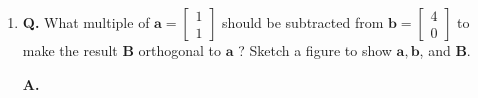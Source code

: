 \documentclass[main.tex]{subfiles}
\begin{document}
\begin{enumerate}
$$\begin{aligned}
\begin{array}{ll}
    9 & 0 \\
    0 & 9
    \end{array}\right] \\
    &=\left[\begin{array}{ll}
    1 & 0 \\
    0 & 1
    \end{array}\right]\\
    Q Q^{T} &=\frac{1}{3}\left[\begin{array}{cc}
    2 & -1 \\
    2 & 2 \\
    -1 & 2
    \end{array}\right] \cdot \frac{1}{3}\left[\begin{array}{ccc}
    2 & 2 & -1 \\
    -1 & 2 & 2
    \end{array}\right] \\
    &=\frac{1}{9}\left[\begin{array}{ccc}
    5 & 2 & -4 \\
    2 & 8 & 2 \\
    -4 & 2 & 5
    \end{array}\right]
    \end{aligned}
    $$
    
    \item [13.] \textbf{Q.} What multiple of $\bm{a}=\left[\begin{array}{l}1 \\ 1\end{array}\right]$ should be subtracted from $\boldsymbol{b}=\left[\begin{array}{l}4 \\ 0\end{array}\right]$ to make the result $\boldsymbol{B}$ orthogonal to $\boldsymbol{a}$ ? Sketch a figure to show $\boldsymbol{a}, \boldsymbol{b}$, and $\boldsymbol{B}$. 
    
    \textbf{A.}
    

\end{enumerate}
\end{document}

